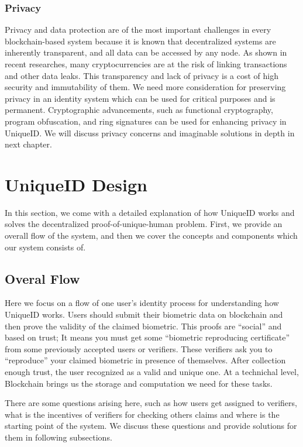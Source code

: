 \documentclass[conference]{IEEEtran}
\begin{document}
\subsubsection{Privacy}
Privacy and data protection are of the most important challenges in every blockchain-based system because it is known that decentralized systems are inherently transparent, and all data can be accessed by any node. As shown in recent researches, many cryptocurrencies are at the risk of linking transactions and other data leaks. This transparency and lack of privacy is a cost of high security and immutability of them. We need more consideration for preserving privacy in an identity system which can be used for critical purposes and is permanent. Cryptographic advancements, such as functional cryptography, program obfuscation, and ring signatures can be used for enhancing privacy in UniqueID. We will discuss privacy concerns and imaginable solutions in depth in next chapter.


\section{UniqueID Design}
In this section, we come with a detailed explanation of how UniqueID works and solves the decentralized proof-of-unique-human problem. First, we provide an overall flow of the system, and then we cover the concepts and components which our system consists of.

\subsection{Overal Flow}

Here we focus on a flow of one user's identity process for understanding how UniqueID works.  Users should submit their biometric data on blockchain and then prove the validity of the claimed biometric. This proofs are “social” and based on trust; It means you must get some “biometric reproducing certificate” from some previously accepted users or verifiers. These verifiers ask you to “reproduce” your claimed biometric in presence of themselves. After collection enough trust, the user recognized as a valid and unique one. At a technichal level, Blockchain brings us the storage and computation we need for these tasks.


There are some questions arising here, such as how users get assigned to verifiers, what is the incentives of verifiers for checking others claims and where is the starting point of the system. We discuss these questions and provide solutions for them in following subsections.
\end{document}
